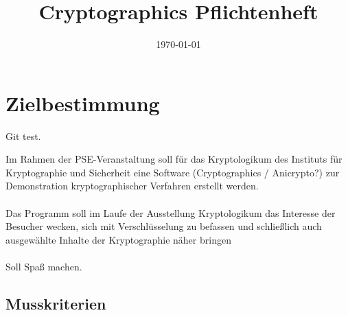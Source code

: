 \documentclass{article}
\title{Cryptographics Pflichtenheft}
\author{}
\date{\today}
\begin{document}
\maketitle
\tableofcontents
\newpage

\section{Zielbestimmung}

Git test.

Im Rahmen der PSE-Veranstaltung soll für das Kryptologikum des Instituts für 
Kryptographie und Sicherheit eine Software (Cryptographics / Anicrypto?) zur 
Demonstration kryptographischer Verfahren erstellt werden. \\
\\
Das Programm soll im Laufe der Ausstellung Kryptologikum das 
Interesse der Besucher wecken, 
sich mit Verschlüsselung zu befassen und 
schließlich auch ausgewählte Inhalte der Kryptographie näher bringen
\\
\\
Soll Spaß machen.

\subsection{Musskriterien}
\end{document}
